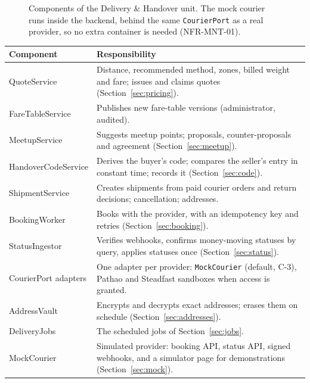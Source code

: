 \documentclass[11pt,a4paper]{article}
\newenvironment{dtable}[1]{\small\begin{longtable}{#1}}{\end{longtable}}
\begin{document}
\begin{figure}[!htbp]
{}
\caption{Components of the Delivery \& Handover unit. The mock courier runs inside the backend, behind the same \texttt{CourierPort} as a real provider, so no extra container is needed (NFR-MNT-01).}
\label{fig:components}
\end{figure}

\begin{dtable}{@{}>{\raggedright\arraybackslash}p{3.6cm}>{\raggedright\arraybackslash}p{11.6cm}@{}}
\toprule
\textbf{Component} & \textbf{Responsibility} \\ \midrule \endhead
QuoteService & Distance, recommended method, zones, billed weight and fare; issues and claims quotes (Section~\ref{sec:pricing}). \\
FareTableService & Publishes new fare-table versions (administrator, audited). \\
MeetupService & Suggests meetup points; proposals, counter-proposals and agreement (Section~\ref{sec:meetup}). \\
HandoverCodeService & Derives the buyer's code; compares the seller's entry in constant time; records it (Section~\ref{sec:code}). \\
ShipmentService & Creates shipments from paid courier orders and return decisions; cancellation; addresses. \\
BookingWorker & Books with the provider, with an idempotency key and retries (Section~\ref{sec:booking}). \\
StatusIngestor & Verifies webhooks, confirms money-moving statuses by query, applies statuses once (Section~\ref{sec:status}). \\
CourierPort adapters & One adapter per provider: \texttt{MockCourier} (default, C-3), Pathao and Steadfast sandboxes when access is granted. \\
AddressVault & Encrypts and decrypts exact addresses; erases them on schedule (Section~\ref{sec:addresses}). \\
DeliveryJobs & The scheduled jobs of Section~\ref{sec:jobs}. \\
MockCourier & Simulated provider: booking API, status API, signed webhooks, and a simulator page for demonstrations (Section~\ref{sec:mock}). \\
\bottomrule
\end{dtable}
\end{document}
